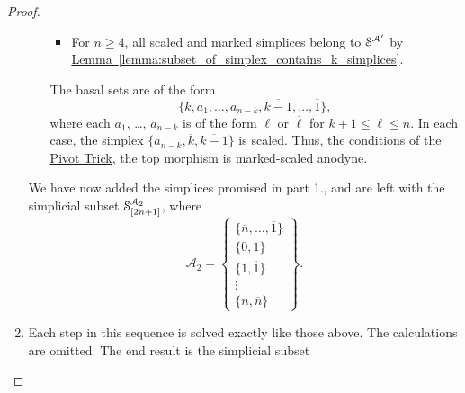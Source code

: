\documentclass[main.tex]{subfiles}
\begin{document}
\begin{proof}
\begin{enumerate}
\begin{itemize}
\begin{itemize}
            \item For $n \geq 4$, all scaled and marked simplices belong to $\S^{\mathcal{A}'}$ by \hyperref[lemma:subset_of_simplex_contains_k_simplices]{Lemma~\ref*{lemma:subset_of_simplex_contains_k_simplices}}.
          \end{itemize}
          The basal sets are of the form
          \begin{equation*}
            \{k, a_{1}, \ldots, a_{n-k}, \overline{k-1}, \ldots, \overline{1}\},
          \end{equation*}
          where each $a_{1}$, \dots, $a_{n-k}$ is of the form $\ell$ or $\overline{\ell}$ for $k+1 \leq \ell \leq n$. In each case, the simplex $\{a_{n-k}, \overline{k}, \overline{k-1}\}$ is scaled. Thus, the conditions of the \hyperref[lemma:pivot_trick]{Pivot Trick}, the top morphism is marked-scaled anodyne.
      \end{itemize}

      We have now added the simplices promised in part 1., and are left with the simplicial subset $\S^{\mathcal{A}_{2}}_{[2n+1]}$, where
      \begin{equation*}
        \mathcal{A}_{2}
        = \left\{ \substack{ \{\overline{n}, \ldots, \overline{1}\} \\ \{0, 1\} \\ \{1, \overline{1}\} \\ \vdots \\ \{n, \overline{n}\} } \right\}.
      \end{equation*}

    \item Each step in this sequence is solved exactly like those above. The calculations are omitted. The end result is the simplicial subset
      
  \end{enumerate}
\end{proof}
\end{document}
